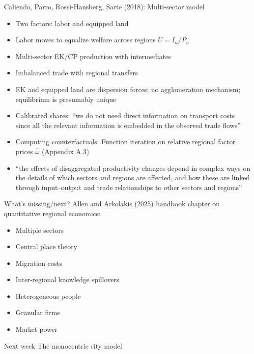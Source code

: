 \documentclass[11pt,notes=hide,aspectratio=169]{beamer}
\begin{document}
\begin{frame}{Caliendo, Parro, Rossi-Hansberg, Sarte (2018): Multi-sector model}
\begin{itemize}
\item Two factors: labor and equipped land
\item Labor moves to equalize welfare across regions $U = I_n / P_n$
\item Multi-sector EK/CP production with intermediates
\item Imbalanced trade with regional transfers
\item EK and equipped land are dispersion forces; no agglomeration mechanism; equilibrium is presumably unique
\item Calibrated shares: ``we do not need direct information on transport costs since all the relevant information is embedded in the observed trade flows''
\item Computing counterfactuals: Function iteration on relative regional factor prices $\hat{\omega}$
(Appendix A.3)
\item {``the effects of disaggregated productivity changes depend in complex ways on the details of which sectors and regions are affected, and how these are linked through input–output and trade relationships to other sectors and regions''\par}
\end{itemize}
\end{frame}
\begin{frame}{What's missing/next?}
Allen and Arkolakis (2025) handbook chapter on quantitative regional economics:
\begin{itemize}
\item Multiple sectors
\item Central place theory
\item Migration costs
\item Inter-regional knowledge spillovers
\item Heterogeneous people
\item Granular firms
\item Market power
\end{itemize}
\end{frame}
\begin{frame}{Next week}
The monocentric city model
\end{frame}
\end{document}
